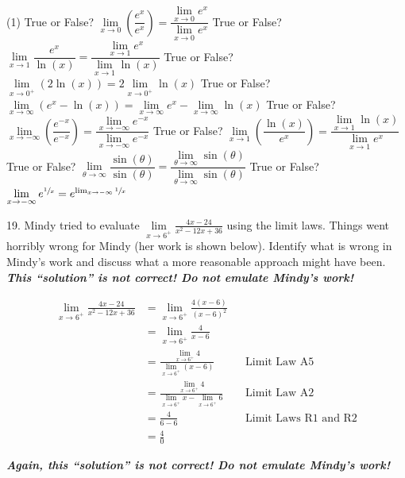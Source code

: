 \documentclass[10pt,oneside,]{book}
\newcommand{\alert}[1]{\textbf{\textit{#1}}}
\theoremstyle{plain}
\theoremstyle{definition}
\numberwithin{equation}{section}
\newcommand{\fe}[2]{#1\mathopen{}\left(#2\right)\mathclose{}}
\begin{document}
\begin{exerciselist}
\par
\begin{exercisegroup}(1)
\exercise[11.]\hypertarget{exercise-hear-me-first}{\null}True or False? \(\lim\limits_{x\to0}\left(\dfrac{e^x}{e^x}\right)=\dfrac{\lim\limits_{x\to0}e^x}{\lim\limits_{x\to0}e^x}\)%
\exercise[12.]\hypertarget{exercise-101}{\null}True or False? \(\lim\limits_{x\to1}\dfrac{e^x}{\fe{\ln}{x}}=\dfrac{\lim\limits_{x\to1}e^x}{\lim\limits_{x\to1}\fe{\ln}{x}}\)%
\exercise[13.]\hypertarget{exercise-102}{\null}True or False? \(\lim\limits_{x\to0^{+}}\left(2\fe{\ln}{x}\right)=2\lim\limits_{x\to0^{+}}\fe{\ln}{x}\)%
\exercise[14.]\hypertarget{exercise-103}{\null}True or False? \(\lim\limits_{x\to\infty}\left(e^x-\fe{\ln}{x}\right)=\lim\limits_{x\to\infty}e^x-\lim\limits_{x\to\infty}\fe{\ln}{x}\)%
\exercise[15.]\hypertarget{exercise-104}{\null}True or False? \(\lim\limits_{x\to-\infty}\left(\dfrac{e^{-x}}{e^{-x}}\right)=\dfrac{\lim\limits_{x\to-\infty}e^{-x}}{\lim\limits_{x\to-\infty}e^{-x}}\)%
\exercise[16.]\hypertarget{exercise-105}{\null}True or False? \(\lim\limits_{x\to1}\left(\dfrac{\fe{\ln}{x}}{e^x}\right)=\dfrac{\lim\limits_{x\to1}\fe{\ln}{x}}{\lim\limits_{x\to1}e^x}\)%
\exercise[17.]\hypertarget{exercise-106}{\null}True or False? \(\lim\limits_{\theta\to\infty}\dfrac{\fe{\sin}{\theta}}{\fe{\sin}{\theta}}=\dfrac{\lim\limits_{\theta\to\infty}\fe{\sin}{\theta}}{\lim\limits_{\theta\to\infty}\fe{\sin}{\theta}}\)%
\exercise[18.]\hypertarget{exercise-hear-me-last}{\null}True or False? \(\lim\limits_{x\to-\infty}e^{\sfrac{1}{x}}=e^{\lim_{x\to-\infty}\sfrac{1}{x}}\)%
\end{exercisegroup}
\par\smallskip\noindent
\item[19.]\hypertarget{exercise-108}{\null}Mindy tried to evaluate \(\lim\limits_{x\to6^{+}}\frac{4x-24}{x^2-12x+36}\) using the limit laws. Things went horribly wrong for Mindy (her work is shown below). Identify what is wrong in Mindy's work and discuss what a more reasonable approach might have been. \alert{This ``solution'' is not correct! Do not emulate Mindy's work!}%
\par
\begin{align*}
\lim_{x\to6^{+}}\frac{4x-24}{x^2-12x+36}&=\lim_{x\to6^{+}}\frac{4(x-6)}{(x-6)^2}\\
&=\lim_{x\to6^{+}}\frac{4}{x-6}\\
&=\frac{\lim\limits_{x\to6^{+}}4}{\lim\limits_{x\to6^{+}}(x-6)}&&\text{Limit Law A5}\\
&=\frac{\lim\limits_{x\to6^{+}}4}{\lim\limits_{x\to6^{+}}x-\lim\limits_{x\to6^{+}}6}&&\text{Limit Law A2}\\
&=\frac{4}{6-6}&&\text{Limit Laws R1 and R2}\\
&=\frac{4}{0}
\end{align*}%
\par
\alert{Again, this ``solution'' is not correct! Do not emulate Mindy's work!}%
\par\smallskip
\end{exerciselist}
\typeout{************************************************}
\typeout{************************************************}
\end{document}
